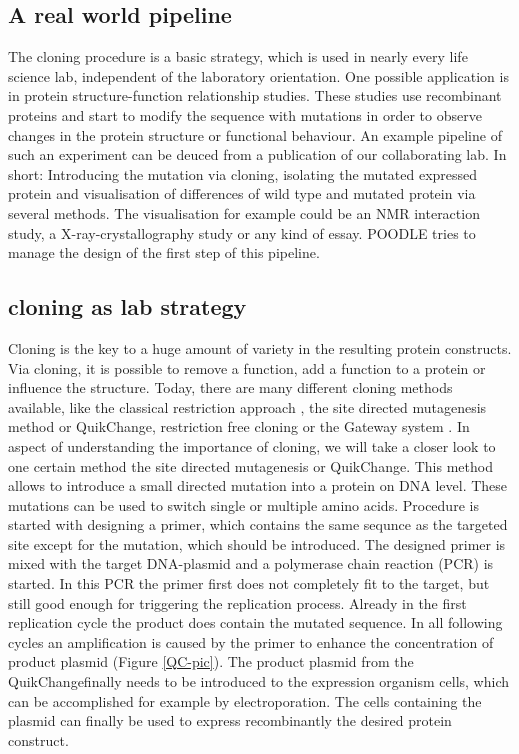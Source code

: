\documentclass{bioinfo}
\begin{document}
\subsection{A real world pipeline}
The cloning procedure is a basic strategy, which is used in nearly every life science lab, independent of the laboratory orientation. One possible application is in protein structure-function relationship studies. These studies use recombinant proteins and start to modify the sequence with mutations in order to observe changes  in the protein structure or functional behaviour. \cite{Clark1} An example pipeline of such an experiment can be deuced from a publication of our collaborating lab. In short: Introducing the mutation via cloning, isolating the mutated expressed protein and visualisation of differences of wild type and mutated protein via several methods. \cite{Mira} The visualisation for example could be an NMR interaction study, a X-ray-crystallography study or any kind of essay. POODLE tries to manage the design of the first step of this pipeline.

\subsection{cloning as lab strategy}
Cloning is the key to a huge amount of variety in the resulting protein constructs. Via cloning, it is possible to remove a function, add a function to a protein or influence the structure. \cite{clark} Today, there are many different cloning methods available, like the classical restriction approach \cite{clark}, the site directed mutagenesis method or QuikChange\textregistered \cite{Quik}, restriction free cloning \cite{Van den Ent} or the Gateway system \cite{clark}. In aspect of understanding the importance of cloning, we will take a closer look to one certain method the site directed mutagenesis or QuikChange\textregistered. This method allows to introduce a small directed mutation into a protein on DNA level. These mutations can be used to switch single or multiple amino acids. Procedure is started with designing a primer, which contains the same sequnce as the targeted site except for the mutation, which should be introduced. The designed primer is mixed with the target DNA-plasmid and a polymerase chain reaction (PCR) is started. In this PCR the primer first does not completely fit to the target, but still good enough for triggering the replication process. Already in the first replication cycle the product does contain the mutated sequence. In all following cycles an amplification is caused by the primer to enhance the concentration of product plasmid (Figure \ref{QC-pic}). \cite{Quik} The product plasmid from the QuikChange\textregistered finally needs to be introduced to the expression organism cells, which can be accomplished for example by electroporation. The cells containing the plasmid can finally be used to express recombinantly the desired protein construct.\cite{Mülhardt1}
\end{document}
